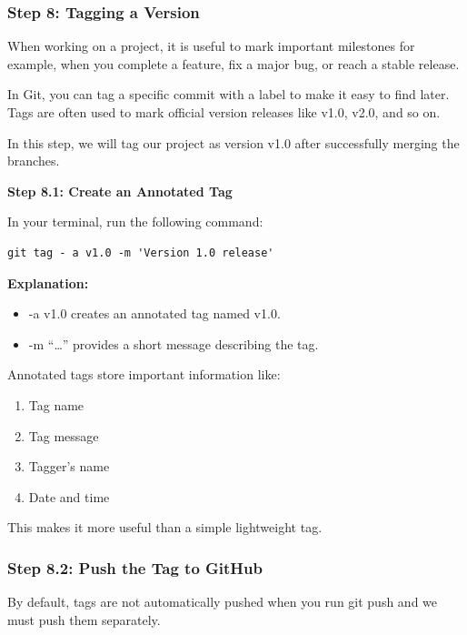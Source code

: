 \documentclass[
  11pt,
  a4paper,
]{article}
\begin{document}
\newpage

\subsubsection{Step 8: Tagging a
Version}\label{step-8-tagging-a-version}

When working on a project, it is useful to mark important milestones for
example, when you complete a feature, fix a major bug, or reach a stable
release.

In Git, you can tag a specific commit with a label to make it easy to
find later. Tags are often used to mark official version releases like
v1.0, v2.0, and so on.

In this step, we will tag our project as version v1.0 after successfully
merging the branches.

\textbf{Step 8.1: Create an Annotated Tag}

In your terminal, run the following command:

\begin{verbatim}
git tag - a v1.0 -m 'Version 1.0 release'
\end{verbatim}

\textbf{Explanation:}

\begin{itemize}
\item
  -a v1.0 creates an annotated tag named v1.0.
\item
  -m ``\ldots{}'' provides a short message describing the tag.
\end{itemize}

Annotated tags store important information like:

\begin{enumerate}
\def\labelenumi{\arabic{enumi}.}
\item
  Tag name
\item
  Tag message
\item
  Tagger's name
\item
  Date and time
\end{enumerate}

This makes it more useful than a simple lightweight tag.

\subsubsection{Step 8.2: Push the Tag to
GitHub}\label{sec-step-8.2-push-the-tag-to-github}

By default, tags are not automatically pushed when you run git push and
we must push them separately.
\end{document}

